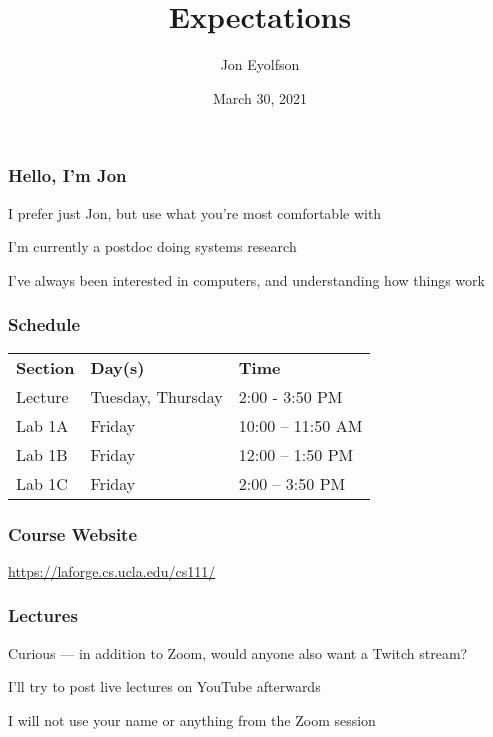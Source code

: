 

\title{Expectations}
\author{Jon Eyolfson}
\date{March 30, 2021}


  \begin{frame}
    \titlepage
  \end{frame}

  \begin{frame}
    \frametitle{Hello, I'm Jon}

    I prefer just Jon, but use what you're most comfortable with

    \vspace{2em}

    I'm currently a postdoc doing systems research

    \vspace{2em}

    I've always been interested in computers, and understanding how things work
  \end{frame}

  \begin{frame}
    \frametitle{Schedule}

    \begin{tabular}{lll}
      \textbf{Section} & \textbf{Day(s)}   & \textbf{Time}     \\
      Lecture          & Tuesday, Thursday & 2:00 - 3:50 PM    \\
      Lab 1A           & Friday            & 10:00 -- 11:50 AM \\
      Lab 1B           & Friday            & 12:00 -- 1:50 PM  \\
      Lab 1C           & Friday            & 2:00 -- 3:50 PM   \\
    \end{tabular}
  \end{frame}

  \begin{frame}
    \frametitle{Course Website}

    \url{https://laforge.cs.ucla.edu/cs111/}
  \end{frame}

  \begin{frame}
    \frametitle{Lectures}

    Curious --- in addition to Zoom, would anyone also want a Twitch stream?

    \vspace{2em}

    I'll try to post live lectures on YouTube afterwards

    \vspace{2em}

    I will not use your name or anything from the Zoom session
  \end{frame}

